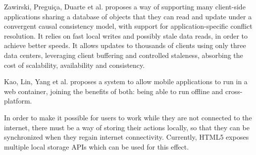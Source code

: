 Zawirski, Preguiça, Duarte et al. \cite{Zawirski2015} proposes a way of supporting many client-side applications sharing a database of objects that they can read and update under a convergent causal consistency model, with support for application-specific conflict resolution. It relies on fast local writes and possibly stale data reads, in order to achieve better speeds. It allows updates to thousands of clients using only three data centers, leveraging client buffering and controlled staleness, absorbing the cost of scalability, availability and consistency.

Kao, Lin, Yang et al. \cite{Kao2012} proposes a system to allow mobile applications to run in a web container, joining the benefits of both: being able to run offline and cross-platform.

In order to make it possible for users to work while they are not connected to the internet, there must be a way of storing their actions locally, so that they can be synchronized when they regain internet connectivity. Currently, HTML5 exposes multiple local storage APIs which can be used for this effect.

